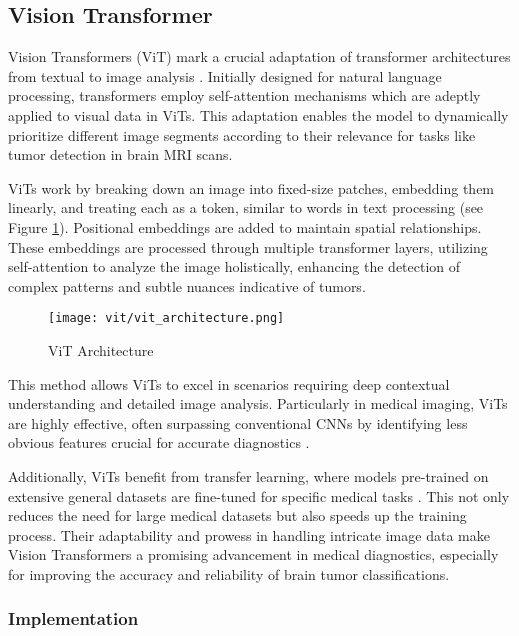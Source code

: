 \subsection{Vision Transformer}\label{s:vit}

Vision Transformers (ViT) mark a crucial adaptation of transformer architectures from textual to image analysis \cite{Khan2021Transformers}. Initially designed for natural language processing, transformers employ self-attention mechanisms which are adeptly applied to visual data in ViTs. This adaptation enables the model to dynamically prioritize different image segments according to their relevance for tasks like tumor detection in brain MRI scans.

ViTs work by breaking down an image into fixed-size patches, embedding them linearly, and treating each as a token, similar to words in text processing \cite{Wu2020Visual} (see Figure \ref{fig:vit_architecture}). Positional embeddings are added to maintain spatial relationships. These embeddings are processed through multiple transformer layers, utilizing self-attention to analyze the image holistically, enhancing the detection of complex patterns and subtle nuances indicative of tumors.

\begin{figure}[H]
  \centering
  \texttt{[image: vit/vit\_architecture.png]}
  \caption{ViT Architecture \cite{curroncol29100590}}
  \label{fig:vit_architecture}
\end{figure}

This method allows ViTs to excel in scenarios requiring deep contextual understanding and detailed image analysis. Particularly in medical imaging, ViTs are highly effective, often surpassing conventional CNNs by identifying less obvious features crucial for accurate diagnostics \cite{Matsoukas2021Is}.

Additionally, ViTs benefit from transfer learning, where models pre-trained on extensive general datasets are fine-tuned for specific medical tasks \cite{Simon2022Vision}. This not only reduces the need for large medical datasets but also speeds up the training process. Their adaptability and prowess in handling intricate image data make Vision Transformers a promising advancement in medical diagnostics, especially for improving the accuracy and reliability of brain tumor classifications.


\subsubsection{Implementation}

